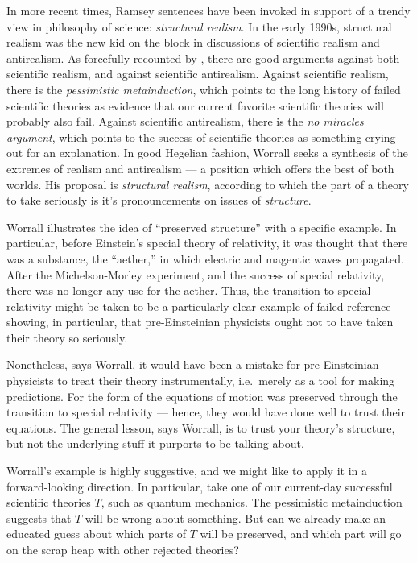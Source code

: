 In more recent times, Ramsey sentences have been invoked in support of
a trendy view in philosophy of science: \emph{structural realism}.  In
the early 1990s, structural realism was the new kid on the block in
discussions of scientific realism and antirealism.  As forcefully
recounted by \cite{worrall}, there are good arguments against both
scientific realism, and against scientific antirealism.  Against
scientific realism, there is the {\it pessimistic metainduction},
which points to the long history of failed scientific theories as
evidence that our current favorite scientific theories will probably
also fail.  Against scientific antirealism, there is the {\it no
  miracles argument}, which points to the success of scientific
theories as something crying out for an explanation.  In good Hegelian
fashion, Worrall seeks a synthesis of the extremes of realism and
antirealism --- a position which offers the best of both worlds.  His
proposal is \emph{structural realism}, according to which the part of
a theory to take seriously is it's pronouncements on issues of {\it
  structure}.

Worrall illustrates the idea of ``preserved structure'' with a
specific example.  In particular, before Einstein's special theory of
relativity, it was thought that there was a substance, the ``aether,''
in which electric and magentic waves propagated.  After the
Michelson-Morley experiment, and the success of special relativity,
there was no longer any use for the aether.  Thus, the transition to
special relativity might be taken to be a particularly clear example
of failed reference --- showing, in particular, that pre-Einsteinian
physicists ought not to have taken their theory so seriously.

Nonetheless, says Worrall, it would have been a mistake for
pre-Einsteinian physicists to treat their theory instrumentally,
i.e.\ merely as a tool for making predictions.  For the form of the
equations of motion was preserved through the transition to special
relativity --- hence, they would have done well to trust their
equations.  The general lesson, says Worrall, is to trust your
theory's structure, but not the underlying stuff it purports to be
talking about.

Worrall's example is highly suggestive, and we might like to apply it
in a forward-looking direction.  In particular, take one of our
current-day successful scientific theories $T$, such as quantum
mechanics.  The pessimistic metainduction suggests that $T$ will be
wrong about something.  But can we already make an educated guess
about which parts of $T$ will be preserved, and which part will go on
the scrap heap with other rejected theories?

